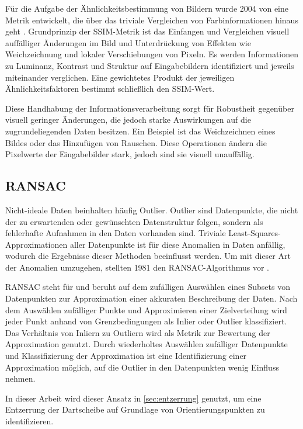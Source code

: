 Für die Aufgabe der Ähnlichkeitsbestimmung von Bildern wurde 2004 von \citeauthor{ssim} eine Metrik entwickelt, die über das triviale Vergleichen von Farbinformationen hinaus geht \cite{ssim,cv_general}. Grundprinzip der SSIM-Metrik ist das Einfangen und Vergleichen visuell auffälliger Änderungen im Bild und Unterdrückung von Effekten wie Weichzeichnung und lokaler Verschiebungen von Pixeln. Es werden Informationen zu Luminanz, Kontrast und Struktur auf Eingabebildern identifiziert und jeweils miteinander verglichen. Eine gewichtetes Produkt der jeweiligen Ähnlichkeitsfaktoren bestimmt schließlich den SSIM-Wert.

Diese Handhabung der Informationsverarbeitung sorgt für Robustheit gegenüber visuell geringer Änderungen, die jedoch starke Auswirkungen auf die zugrundeliegenden Daten besitzen. Ein Beispiel ist das Weichzeichnen eines Bildes oder das Hinzufügen von Rauschen. Diese Operationen ändern die Pixelwerte der Eingabebilder stark, jedoch sind sie visuell unauffällig.


\subsection{RANSAC}
\label{sec:ransac}

Nicht-ideale Daten beinhalten häufig Outlier. Outlier sind Datenpunkte, die nicht der zu erwartenden oder gewünschten Datenstruktur folgen, sondern als fehlerhafte Aufnahmen in den Daten vorhanden sind. Triviale Least-Squares-Approximationen aller Datenpunkte ist für diese Anomalien in Daten anfällig, wodurch die Ergebnisse dieser Methoden beeinflusst werden. Um mit dieser Art der Anomalien umzugehen, stellten \citeauthor{ransac} 1981 den RANSAC-Algorithmus vor \cite{ransac,cv_general}.

RANSAC steht für  und beruht auf dem zufälligen Auswählen eines Subsets von Datenpunkten zur Approximation einer akkuraten Beschreibung der Daten. Nach dem Auswählen zufälliger Punkte und Approximieren einer Zielverteilung wird jeder Punkt anhand von Grenzbedingungen als Inlier oder Outlier klassifiziert. Das Verhältnis von Inliern zu Outliern wird als Metrik zur Bewertung der Approximation genutzt. Durch wiederholtes Auswählen zufälliger Datenpunkte und Klassifizierung der Approximation ist eine Identifizierung einer Approximation möglich, auf die Outlier in den Datenpunkten wenig Einfluss nehmen.

In dieser Arbeit wird dieser Ansatz in \autoref{sec:entzerrung} genutzt, um eine Entzerrung der Dartscheibe auf Grundlage von Orientierungspunkten zu identifizieren.

